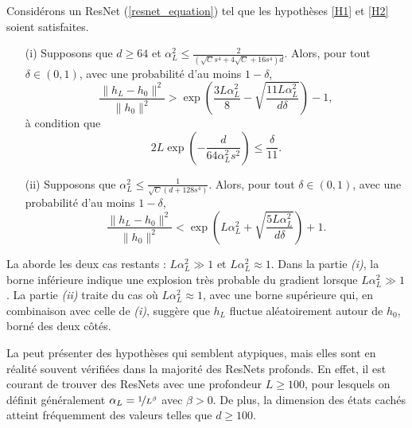 \begin{proposition}[Admise]\label{prop3}
    Considérons un ResNet (\ref{resnet_equation}) tel que les hypothèses \ref{H1} et \ref{H2} soient satisfaites.
    \begin{itemize}
        \item[(i)] Supposons que $ d \geq 64 $ et $ \alpha _L ^2 \leq  \frac{2}{ (\sqrt{C} s^4 + 4 \sqrt{C} + 16 s ^4) d } $. Alors, pour tout $ \delta \in (0, 1) $, avec une probabilité d'au moins $ 1 - \delta $,
        \[
            \frac{\|h_L - h_0\|^2}{\|h_0\|^2} > \exp\left(\frac{3L\alpha_L^2}{8} - \sqrt{\frac{11L\alpha_L^2}{d\delta}}\right) - 1,
        \]
        à condition que
        \[
            2L \exp\left(-\frac{d}{64\alpha_L^2s^2}\right) \leq \frac{\delta}{11}.
        \]
        \item[(ii)] Supposons que $ \alpha_L^2 \leq \frac{1}{\sqrt{C}(d + 128s^4)} $. Alors, pour tout $ \delta \in (0, 1)$, avec une probabilité d'au moins $1 - \delta $,
        \[
            \frac{\|h_L - h_0\|^2}{\|h_0\|^2} < \exp\left(L\alpha_L^2 + \sqrt{\frac{5L\alpha_L^2}{d\delta}}\right) + 1.
        \]
    \end{itemize}
\end{proposition}
La  aborde les deux cas restants : $L \alpha_L^2 \gg 1$ et $L \alpha_L^2 \approx 1$. Dans la partie \textit{(i)}, la borne inférieure indique une explosion très probable du gradient lorsque $L \alpha_L^2 \gg 1$. La partie \textit{(ii)} traite du cas où $L \alpha_L^2 \approx 1$, avec une borne supérieure qui, en combinaison avec celle de \textit{(i)}, suggère que $h_L$ fluctue aléatoirement autour de $h_0$, borné des deux côtés.

La  peut présenter des hypothèses qui semblent atypiques, mais elles sont en réalité souvent vérifiées dans la majorité des ResNets profonds. En effet, il est courant de trouver des ResNets avec une profondeur $L \geq 100$, pour lesquels on définit généralement $\alpha_L = \nicefrac{1}{L^\beta}$ avec $\beta > 0$. De plus, la dimension des états cachés atteint fréquemment des valeurs telles que $d \geq 100$.

